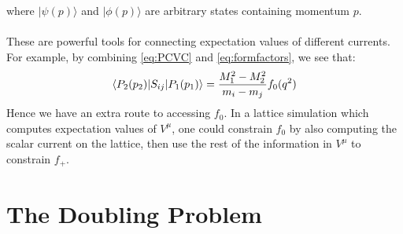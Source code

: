 where $| \psi(p) \rangle$ and $| \phi(p) \rangle$ are arbitrary states containing momentum $p$.
\\ \\
These are powerful tools for connecting expectation values of different currents. For example, by combining \eqref{eq:PCVC} and \eqref{eq:formfactors}, we see that:
\begin{align}
	\langle P_2(p_2) | S_{ij} | P_1(p_1) \rangle = {M_1^2 - M_2^2 \over m_i - m_j} f_0(q^2)
\end{align}
Hence we have an extra route to accessing $f_0$. In a lattice simulation which computes expectation values of $V^{\mu}$, one could constrain $f_0$ by also computing the scalar current on the lattice, then use the rest of the information in $V^{\mu}$ to constrain $f_+$.

\section{The Doubling Problem}
\label{sec:doublingprob}

